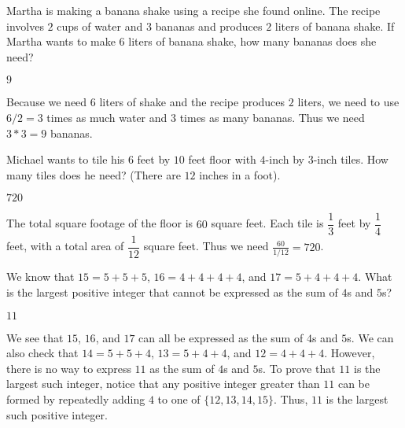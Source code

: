 \documentclass[11pt]{article}
\begin{document}
\setlength{\parindent}{0pt}

\begin{problem}
Martha is making a banana shake using a recipe she found online. The recipe involves $2$ cups of water and $3$ bananas and produces $2$ liters of banana shake. If Martha wants to make $6$ liters of banana shake, how many bananas does she need?
\end{problem}

\begin{answer}
$9$
\end{answer}

\begin{solution}
Because we need $6$ liters of shake and the recipe produces $2$ liters, we need to use $6/2 = 3$ times as much water and $3$ times as many bananas. Thus we need $3*3 = \boxed{9}$ bananas. 
\end{solution}


\begin{problem}
Michael wants to tile his $6$ feet by $10$ feet floor with $4$-inch by $3$-inch tiles. How many tiles does he need? (There are $12$ inches in a foot).
\end{problem}

\begin{answer}
$720$
\end{answer}

\begin{solution}
The total square footage of the floor is $60$ square feet. Each tile is $\dfrac{1}{3}$ feet by $\dfrac{1}{4}$ feet, with a total area of $\dfrac{1}{12}$ square feet. Thus we need $\frac{60}{1/12} = \boxed{720}$.
\end{solution}


\begin{problem}
We know that $15 = 5 + 5 + 5$, $16 = 4 + 4 + 4 + 4$, and $17 = 5 + 4 + 4 + 4$. What is the largest positive integer that cannot be expressed as the sum of $4$s and $5$s? 
\end{problem}
\begin{answer}
$11$
\end{answer}
\begin{solution}
We see that $15$, $16$, and $17$ can all be expressed as the sum of $4$s and $5$s. We can also check that $14 = 5 + 5 + 4$, $13 = 5 + 4 + 4$, and $12 = 4 + 4 + 4$. However, there is no way to express $11$ as the sum of $4$s and $5$s. To prove that $11$ is the largest such integer, notice that any positive integer greater than $11$ can be formed by repeatedly adding $4$ to one of $\{12, 13, 14, 15\}$. Thus, $\boxed{11}$ is the largest such positive integer.
\end{solution}
\end{document}
